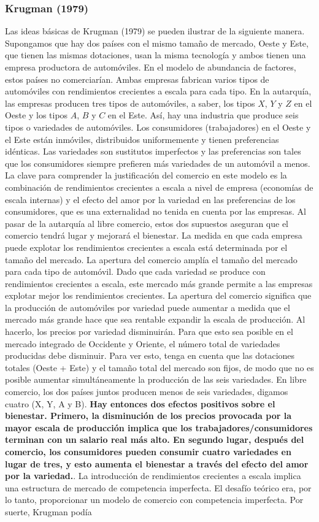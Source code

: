 \subsubsection{Krugman (1979)}
Las ideas básicas de Krugman (1979) se pueden ilustrar de la siguiente manera. Supongamos que hay dos países con el mismo tamaño de mercado, Oeste y Este, que tienen las mismas dotaciones, usan la misma tecnología y ambos tienen una empresa productora de automóviles. En el modelo de abundancia de factores, estos países no comerciarían. Ambas empresas fabrican varios tipos de automóviles con rendimientos crecientes a escala para cada tipo. En la autarquía, las empresas producen tres tipos de automóviles, a saber, los tipos $X$, $Y$ y $Z$ en el Oeste y los tipos $A$, $B$ y $C$ en el Este. Así, hay una industria que produce seis tipos o variedades de automóviles. Los consumidores (trabajadores) en el Oeste y el Este están inmóviles, distribuidos uniformemente y tienen preferencias idénticas. Las variedades son sustitutos imperfectos y las preferencias son tales que los consumidores siempre prefieren más variedades de un automóvil a menos.  La clave para comprender la justificación del comercio en este modelo es la combinación de rendimientos crecientes a escala a nivel de empresa (economías de escala internas) y el efecto del amor por la variedad en las preferencias de los consumidores, que es una externalidad no tenida en cuenta por las empresas. Al pasar de la autarquía al libre comercio, estos dos supuestos aseguran que el comercio tendrá lugar y mejorará el bienestar. La medida en que cada empresa puede explotar los rendimientos crecientes a escala está determinada por el tamaño del mercado. La apertura del comercio amplía el tamaño del mercado para cada tipo de automóvil. Dado que cada variedad se produce con rendimientos crecientes a escala, este mercado más grande permite a las empresas explotar mejor los rendimientos crecientes. La apertura del comercio significa que la producción de automóviles por variedad puede aumentar a medida que el mercado más grande hace que sea rentable expandir la escala de producción. Al hacerlo, los precios por variedad disminuirán. Para que esto sea posible en el mercado integrado de Occidente y Oriente, el número total de variedades producidas debe disminuir. Para ver esto, tenga en cuenta que las dotaciones totales (Oeste + Este) y el tamaño total del mercado son fijos, de modo que no es posible aumentar simultáneamente la producción de las seis variedades. En libre comercio, los dos países juntos producen menos de seis variedades, digamos cuatro (X, Y, A y B). \textbf{Hay entonces dos efectos positivos sobre el bienestar. Primero, la disminución de los precios provocada por la mayor escala de producción implica que los trabajadores/consumidores terminan con un salario real más alto. En segundo lugar, después del comercio, los consumidores pueden consumir cuatro variedades en lugar de tres, y esto aumenta el bienestar a través del efecto del amor por la variedad.}. La introducción de rendimientos crecientes a escala implica una estructura de mercado de competencia imperfecta. El desafío teórico era, por lo tanto, proporcionar un modelo de comercio con competencia imperfecta. Por suerte, Krugman podía 